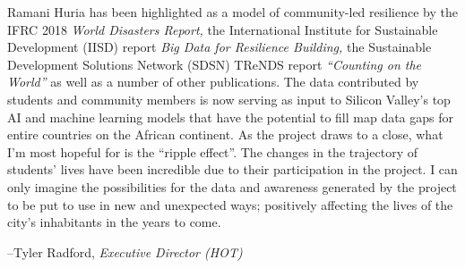 \documentclass[a4paper,12pt,twoside]{article}
\begin{document}
\begin{multicols}{2}
Ramani Huria has been highlighted as a model of community-led resilience by the IFRC 2018 \textit{World Disasters Report,} the International Institute for Sustainable Development (IISD) report \textit{Big Data for Resilience Building,} the Sustainable Development Solutions Network (SDSN) TReNDS report \textit{“Counting on the World”} as well as a number of other publications. The data contributed by students and community members is now serving as input to Silicon Valley’s top AI and machine learning models that have the potential to fill map data gaps for entire countries on the African continent. As the project draws to a close, what I’m most hopeful for is the “ripple effect”. The changes in the trajectory of students’ lives have been incredible due to their participation in the project. I can only imagine the possibilities for the data and awareness generated by the project to be put to use in new and unexpected ways; positively affecting the lives of the city’s inhabitants in the years to come.

\end{multicols}

--Tyler Radford, \textit{Executive Director (HOT)}

\clearpage

\newpage
\end{document}
